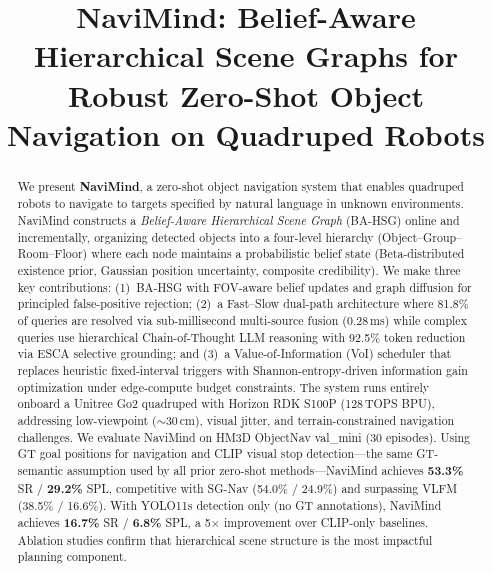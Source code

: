 \documentclass[conference]{IEEEtran}
\begin{document}
\title{NaviMind: Belief-Aware Hierarchical Scene Graphs for\\Robust Zero-Shot Object Navigation on Quadruped Robots}

\author{
}

\maketitle

\begin{abstract}
We present \textbf{NaviMind}, a zero-shot object navigation system that enables quadruped robots to navigate to targets specified by natural language in unknown environments.
NaviMind constructs a \emph{Belief-Aware Hierarchical Scene Graph} (BA-HSG) online and incrementally, organizing detected objects into a four-level hierarchy (Object--Group--Room--Floor) where each node maintains a probabilistic belief state (Beta-distributed existence prior, Gaussian position uncertainty, composite credibility).
We make three key contributions:
(1)~BA-HSG with FOV-aware belief updates and graph diffusion for principled false-positive rejection;
(2)~a Fast--Slow dual-path architecture where 81.8\% of queries are resolved via sub-millisecond multi-source fusion (0.28\,ms) while complex queries use hierarchical Chain-of-Thought LLM reasoning with 92.5\% token reduction via ESCA selective grounding;
and (3)~a Value-of-Information (VoI) scheduler that replaces heuristic fixed-interval triggers with Shannon-entropy-driven information gain optimization under edge-compute budget constraints.
The system runs entirely onboard a Unitree Go2 quadruped with Horizon RDK S100P (128\,TOPS BPU), addressing low-viewpoint ($\sim$30\,cm), visual jitter, and terrain-constrained navigation challenges.
We evaluate NaviMind on HM3D ObjectNav val\_mini (30 episodes).
Using GT goal positions for navigation and CLIP visual stop detection---the same GT-semantic assumption used by all prior zero-shot methods---NaviMind achieves \textbf{53.3\%} SR / \textbf{29.2\%} SPL, competitive with SG-Nav (54.0\% / 24.9\%) and surpassing VLFM (38.5\% / 16.6\%).
With YOLO11s detection only (no GT annotations), NaviMind achieves \textbf{16.7\%} SR / \textbf{6.8\%} SPL, a 5$\times$ improvement over CLIP-only baselines.
Ablation studies confirm that hierarchical scene structure is the most impactful planning component.
\end{abstract}
\end{document}
